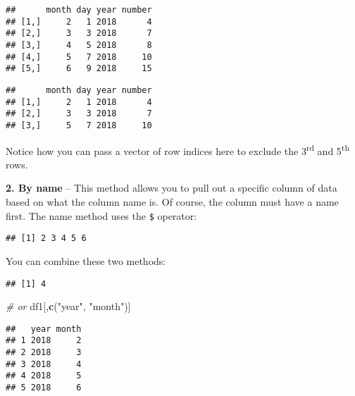 \documentclass[]{book}
\newenvironment{Shaded}{\begin{snugshade}}{\end{snugshade}}
\newcommand{\KeywordTok}[1]{\textcolor[rgb]{0.13,0.29,0.53}{\textbf{#1}}}
\newcommand{\DecValTok}[1]{\textcolor[rgb]{0.00,0.00,0.81}{#1}}
\newcommand{\StringTok}[1]{\textcolor[rgb]{0.31,0.60,0.02}{#1}}
\newcommand{\CommentTok}[1]{\textcolor[rgb]{0.56,0.35,0.01}{\textit{#1}}}
\newcommand{\OperatorTok}[1]{\textcolor[rgb]{0.81,0.36,0.00}{\textbf{#1}}}
\newcommand{\NormalTok}[1]{#1}
\theoremstyle{definition}
\theoremstyle{definition}
\theoremstyle{definition}
\theoremstyle{remark}
\begin{document}
\begin{verbatim}
##      month day year number
## [1,]     2   1 2018      4
## [2,]     3   3 2018      7
## [3,]     4   5 2018      8
## [4,]     5   7 2018     10
## [5,]     6   9 2018     15
\end{verbatim}

\begin{verbatim}
##      month day year number
## [1,]     2   1 2018      4
## [2,]     3   3 2018      7
## [3,]     5   7 2018     10
\end{verbatim}

Notice how you can pass a vector of row indices here to exclude the
3\textsuperscript{rd} and 5\textsuperscript{th} rows.

\textbf{2. By name} -- This method allows you to pull out a specific
column of data based on what the column name is. Of course, the column
must have a name first. The name method uses the \texttt{\$} operator:

\begin{Shaded}
\end{Shaded}

\begin{verbatim}
## [1] 2 3 4 5 6
\end{verbatim}

You can combine these two methods:

\begin{Shaded}
\end{Shaded}

\begin{verbatim}
## [1] 4
\end{verbatim}

\begin{Shaded}
\begin{Highlighting}[]
\CommentTok{# or}
\NormalTok{df1[,}\KeywordTok{c}\NormalTok{(}\StringTok{"year"}\NormalTok{, }\StringTok{"month"}\NormalTok{)]}
\end{Highlighting}
\end{Shaded}

\begin{verbatim}
##   year month
## 1 2018     2
## 2 2018     3
## 3 2018     4
## 4 2018     5
## 5 2018     6
\end{verbatim}
\end{document}
